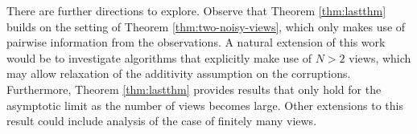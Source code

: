 There are further directions to explore.
Observe that Theorem \ref{thm:lastthm} builds on the setting of Theorem \ref{thm:two-noisy-views}, which only makes use of pairwise information from the observations.
A natural extension of this work would be to investigate algorithms that explicitly make use of $N>2$ views, which may allow relaxation of the additivity assumption on the corruptions.
Furthermore, Theorem \ref{thm:lastthm} provides results that only hold for the asymptotic limit as the number of views becomes large.
Other extensions to this result could include analysis of the case of finitely many views.





